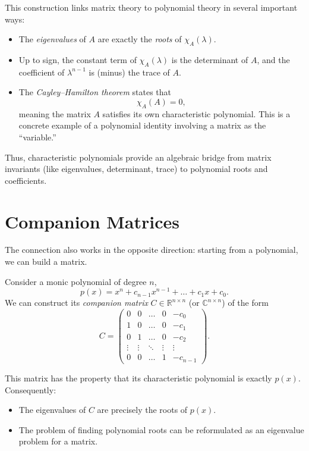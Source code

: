 \documentclass[11pt]{article}
\begin{document}
This construction links matrix theory to polynomial theory in several important ways:
\begin{itemize}
  \item The \emph{eigenvalues} of \(A\) are exactly the \emph{roots} of \(\chi_A(\lambda)\).
  \item Up to sign, the constant term of \(\chi_A(\lambda)\) is the determinant of \(A\), and the coefficient of \(\lambda^{n-1}\) is (minus) the trace of \(A\).
  \item The \emph{Cayley--Hamilton theorem} states that
  \[
    \chi_A(A) = 0,
  \]
  meaning the matrix \(A\) satisfies its own characteristic polynomial. This is a concrete example of a polynomial identity involving a matrix as the ``variable.''
\end{itemize}

Thus, characteristic polynomials provide an algebraic bridge from matrix invariants (like eigenvalues, determinant, trace) to polynomial roots and coefficients.

\section{Companion Matrices}

The connection also works in the opposite direction: starting from a polynomial, we can build a matrix.

Consider a monic polynomial of degree \(n\),
\[
p(x) = x^n + c_{n-1} x^{n-1} + \dots + c_1 x + c_0.
\]
We can construct its \emph{companion matrix} \(C \in \mathbb{R}^{n \times n}\) (or \(\mathbb{C}^{n \times n}\)) of the form
\[
C =
\begin{pmatrix}
0      & 0      & \dots  & 0      & -c_0 \\
1      & 0      & \dots  & 0      & -c_1 \\
0      & 1      & \dots  & 0      & -c_2 \\
\vdots & \vdots & \ddots & \vdots & \vdots \\
0      & 0      & \dots  & 1      & -c_{n-1}
\end{pmatrix}.
\]

This matrix has the property that its characteristic polynomial is exactly \(p(x)\). Consequently:
\begin{itemize}
  \item The eigenvalues of \(C\) are precisely the roots of \(p(x)\).
  \item The problem of finding polynomial roots can be reformulated as an eigenvalue problem for a matrix.
\end{itemize}
\end{document}
